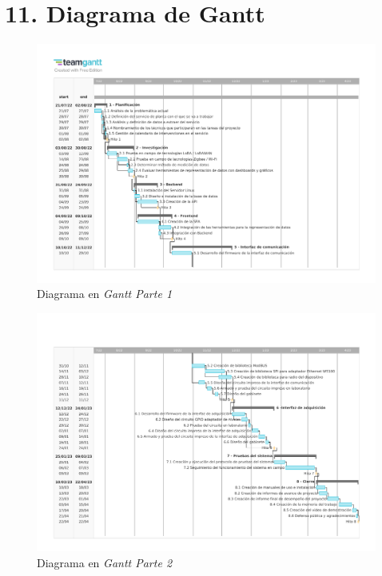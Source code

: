 \documentclass[
11pt%
]{charter}
\begin{document}


\section{11. Diagrama de Gantt}
\label{sec:gantt}


\centering
\begin{figure}

\includegraphics[width=1\textwidth]{./Figuras/gantt_A5_1.pdf}
\caption{Diagrama en \textit{Gantt Parte 1}}
\label{fig:diagBloques}
\end{figure}


\begin{figure}
\centering 
\includegraphics[width=1\textwidth]{./Figuras/gantt_A5_2_ed.pdf}
\caption{Diagrama en \textit{Gantt Parte 2}}
\label{fig:diagBloques}
\end{figure}
\end{document}
